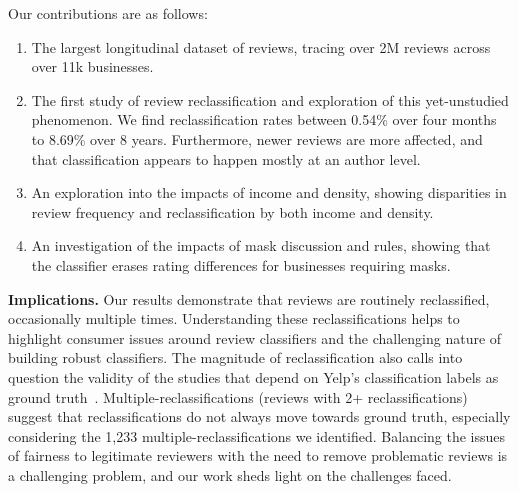 Our contributions are as follows:
\begin{enumerate}
    \item The largest longitudinal dataset of reviews, tracing over 2M reviews across over 11k businesses.
    \item The first study of review reclassification and exploration of this yet-unstudied phenomenon. We find reclassification rates between 0.54\% over four months to 8.69\% over 8 years. Furthermore,  newer reviews are more affected, and that classification appears to happen mostly at an author level.
    \item An exploration into the impacts of income and density, showing disparities in review frequency and reclassification by both income and density.
    \item An investigation of the impacts of mask discussion and rules, showing that the classifier erases rating differences for businesses requiring masks.
\end{enumerate}


\textbf{Implications.} Our results demonstrate that reviews are routinely reclassified, occasionally multiple times. Understanding these reclassifications helps to highlight consumer issues around review classifiers and the challenging nature of building robust classifiers. The magnitude of reclassification also calls into question the validity of the studies that depend on Yelp's classification labels as ground truth~\cite{rayana2015collective,kc2016temporal,mukherjee2013yelp,zhu2021ifspard,shehnepoor2017netspam,yao2017automated}. Multiple-reclassifications (reviews with 2+ reclassifications) suggest that reclassifications do not always move towards ground truth, especially considering the 1,233 multiple-reclassifications we identified. Balancing the issues of fairness to legitimate reviewers with the need to remove problematic reviews is a challenging problem, and our work sheds light on the challenges faced.

